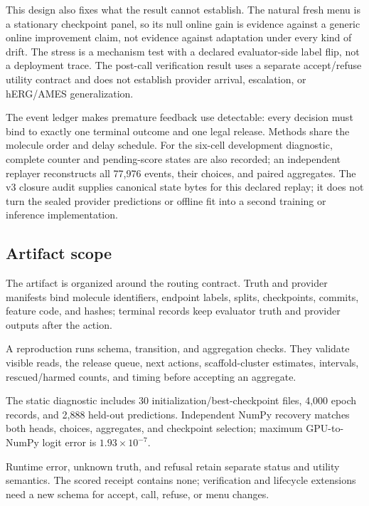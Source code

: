 \documentclass[sigconf,anonymous]{aamas}
\begin{document}
This design also fixes what the result cannot establish. The natural fresh menu is a stationary checkpoint panel, so its null online gain is evidence against a generic online improvement claim, not evidence against adaptation under every kind of drift. The stress is a mechanism test with a declared evaluator-side label flip, not a deployment trace. The post-call verification result uses a separate accept/refuse utility contract and does not establish provider arrival, escalation, or hERG/AMES generalization.

The event ledger makes premature feedback use detectable: every decision must bind to exactly one terminal outcome and one legal release. Methods share the molecule order and delay schedule. For the six-cell development diagnostic, complete counter and pending-score states are also recorded; an independent replayer reconstructs all 77,976 events, their choices, and paired aggregates. The v3 closure audit supplies canonical state bytes for this declared replay; it does not turn the sealed provider predictions or offline fit into a second training or inference implementation.



\subsection{Artifact scope}
The artifact is organized around the routing contract. Truth and provider manifests bind molecule identifiers, endpoint labels, splits, checkpoints, commits, feature code, and hashes; terminal records keep evaluator truth and provider outputs after the action.



A reproduction runs schema, transition, and aggregation checks. They validate visible reads, the release queue, next actions, scaffold-cluster estimates, intervals, rescued/harmed counts, and timing before accepting an aggregate.

The static diagnostic includes 30 initialization/best-checkpoint files, 4,000 epoch records, and 2,888 held-out predictions. Independent NumPy recovery matches both heads, choices, aggregates, and checkpoint selection; maximum GPU-to-NumPy logit error is $1.93\times10^{-7}$.

Runtime error, unknown truth, and refusal retain separate status and utility semantics. The scored receipt contains none; verification and lifecycle extensions need a new schema for accept, call, refuse, or menu changes.
\end{document}
